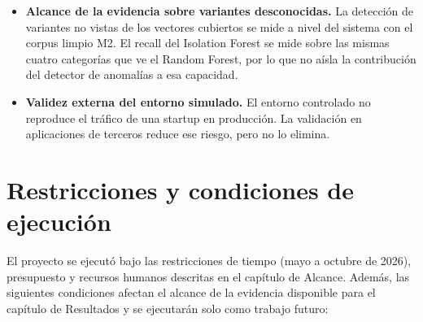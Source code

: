 \begin{itemize}
    todo las de SQLi; este trabajo no cuantificó ese efecto. El análisis por distancia de
    Levenshtein (211 pares, todos de la fuente CAPEC) lo subestimó, porque solo compara consultas de
    1 a 100 caracteres y hasta 10{,}000 comparaciones por clase.
    \item \textbf{Alcance de la evidencia sobre variantes desconocidas.} La detección de
    variantes no vistas de los vectores cubiertos se mide a nivel del sistema con el corpus limpio
    M2. El recall del Isolation Forest se mide sobre las mismas cuatro categorías que ve el Random
    Forest, por lo que no aísla la contribución del detector de anomalías a esa capacidad.
    \item \textbf{Validez externa del entorno simulado.} El entorno controlado no reproduce el
    tráfico de una startup en producción. La validación en aplicaciones de terceros reduce ese
    riesgo, pero no lo elimina.
\end{itemize}

\section{Restricciones y condiciones de ejecución}
\label{sec:met-restricciones}

El proyecto se ejecutó bajo las restricciones de tiempo (mayo a octubre de 2026), presupuesto y
recursos humanos descritas en el capítulo de Alcance. Además, las siguientes condiciones afectan
el alcance de la evidencia disponible para el capítulo de Resultados y se ejecutarán solo como
trabajo futuro:

